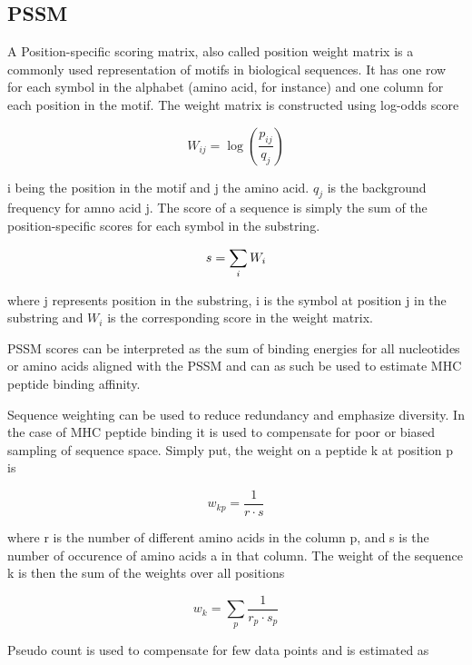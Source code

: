 


\subsection*{PSSM}
A Position-specific scoring matrix, also called position weight matrix is a commonly used representation of motifs in biological sequences. 
It has one row for each symbol in the alphabet (amino acid, for instance) and one column for each position in the motif.
The weight matrix is constructed using log-odds score

\begin{equation}
W_{ij} = \log{ (\frac{p_{ij}}{q_j}) }
\end{equation}

i being the position in the motif and j the amino acid. $q_j$ is the background frequency for amno acid j. 
The score of a sequence is simply the sum of the position-specific scores for each symbol in the substring.

\begin{equation}
s = \sum_{i}{W_{i}} \\
\end{equation}

where j represents position in the substring, i is the symbol at position j in the substring and $W_{i}$ is the corresponding score in the weight matrix.

PSSM scores can be interpreted as the sum of binding energies for all nucleotides or amino acids aligned with the PSSM and can as such be used to estimate MHC peptide binding affinity.

Sequence weighting can be used to reduce redundancy and emphasize diversity. In the case of MHC peptide binding it is used to compensate for poor or biased sampling of sequence space.
Simply put, the weight on a peptide k at position p is

\begin{equation}
w_{kp} = \frac{1}{r\cdot s}
\end{equation}

where r is the number of different amino acids in the column p, and s is the number of occurence of amino acids a in that column. The weight of the sequence k is then the sum of the weights over all positions

\begin{equation}
w_{k} = \sum_{p}{\frac{1}{r_p \cdot s_p}}
\end{equation}

Pseudo count is used to compensate for few data points and is estimated as

